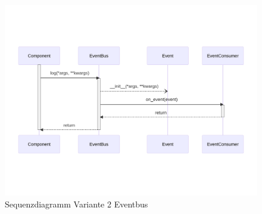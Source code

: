 \begin{figure}[!hb]
	\centering
	\includegraphics[width=0.75\linewidth]{images/diagrams/eventbus-v2-seq.png}
	\caption{Sequenzdiagramm Variante 2 Eventbus}
	\label{fig:eventbus-v2-seq}
\end{figure}
